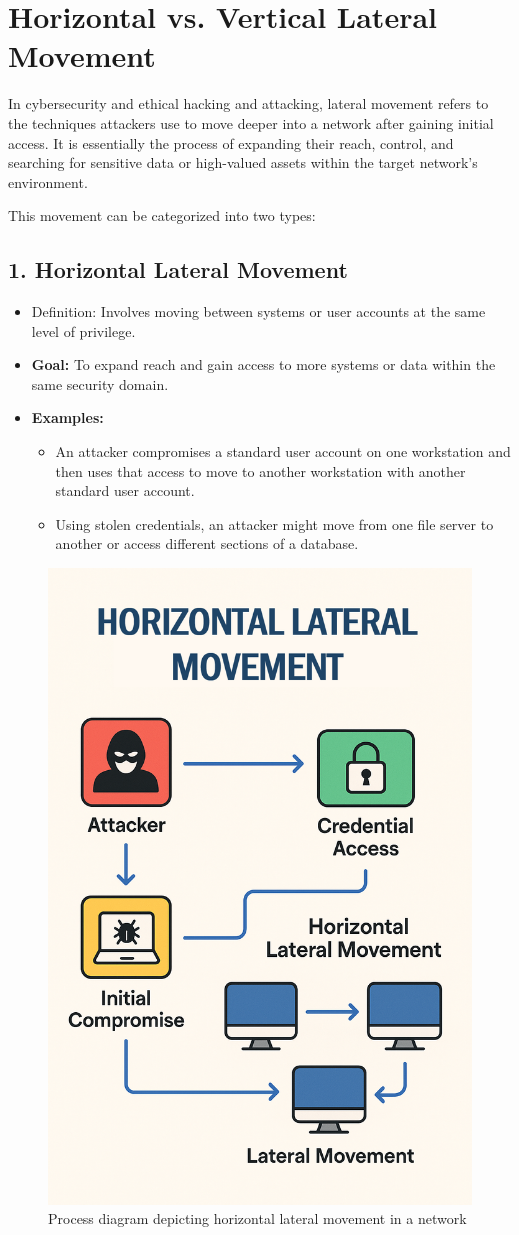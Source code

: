 \section{Horizontal vs. Vertical Lateral Movement}
In cybersecurity and ethical hacking and attacking, lateral movement refers to the techniques attackers use to move deeper into a network after gaining initial access. It is essentially the process of expanding their reach, control, and searching for sensitive data or high-valued assets within the target network's environment.

This movement can be categorized into two types:
\subsection{1. Horizontal Lateral Movement}
\begin{itemize}
    \item Definition: Involves moving between systems or user accounts at the same level of privilege.
    \item \textbf{Goal:} To expand reach and gain access to more systems or data within the same security domain.
    \item \textbf{Examples:}
    \begin{itemize}
        \item An attacker compromises a standard user account on one workstation and then uses that access to move to another workstation with another standard user account.
        \item Using stolen credentials, an attacker might move from one file server to another or access different sections of a database.
    \end{itemize}
\end{itemize}


\begin{figure}[h]
    \centering
    \includegraphics[width=0.5\linewidth]{horizontal-movement.png}
    \caption{Process diagram depicting horizontal lateral movement in a network}
    \label{fig:placeholder}
\end{figure}


